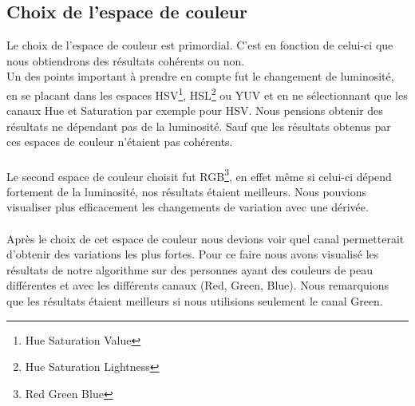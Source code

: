  \subsection{Choix de l'espace de couleur}
 Le choix de l'espace de couleur est primordial. C'est en fonction de celui-ci que nous obtiendrons des résultats cohérents ou non.\\
 Un des points important à prendre en compte fut le changement de luminosité, en se placant dans les espaces HSV\footnote{Hue Saturation Value}, HSL\footnote{Hue Saturation Lightness} ou YUV et en ne sélectionnant que les canaux Hue et Saturation par exemple pour HSV. Nous
  pensions obtenir des résultats ne dépendant pas de la luminosité. Sauf que les résultats obtenus par ces espaces de couleur n'étaient pas cohérents.\\
 \\
 Le second espace de couleur choisit fut RGB\footnote{Red Green Blue}, en effet même si celui-ci dépend fortement de la luminosité, nos résultats étaient meilleurs. Nous pouvions visualiser plus efficacement les changements de
 variation avec une dérivée.\\
 \\
 Après le choix de cet espace de couleur nous devions voir quel canal permetterait d'obtenir des variations les plus fortes. Pour ce faire nous avons visualisé les résultats de notre algorithme sur des personnes ayant des couleurs de peau différentes et avec les différents canaux (Red, Green, Blue). Nous remarquions que les résultats étaient meilleurs si nous utilisions seulement le canal Green.


